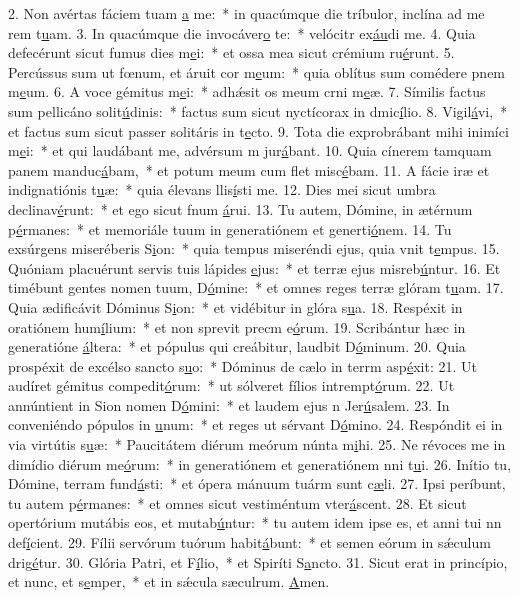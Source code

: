 2. Non avértas fáciem tuam \uline{a} me:~* in quacúmque die tríbulor, inclína ad me rem t\uline{u}am.
3. In quacúmque die invocáver\uline{o} te:~* velócitr ex\uline{áu}di me.
4. Quia defecérunt sicut fumus dies m\uline{e}i:~* et ossa mea sicut crémium ru\uline{é}runt.
5. Percússus sum ut fœnum, et áruit cor m\uline{e}um:~* quia oblítus sum comédere pnem m\uline{e}um.
6. A voce gémitus m\uline{e}i:~* adhǽsit os meum crni m\uline{e}æ.
7. Símilis factus sum pellicáno solit\uline{ú}dinis:~* factus sum sicut nyctícorax in dmic\uline{í}lio.
8. Vigil\uline{á}vi,~* et factus sum sicut passer solitáris in t\uline{e}cto.
9. Tota die exprobrábant mihi inimíci m\uline{e}i:~* et qui laudábant me, advérsum m jur\uline{á}bant.
10. Quia cínerem tamquam panem manduc\uline{á}bam,~* et potum meum cum flet misc\uline{é}bam.
11. A fácie iræ et indignatiónis t\uline{u}æ:~* quia élevans llis\uline{í}sti me.
12. Dies mei sicut umbra declinav\uline{é}runt:~* et ego sicut fnum \uline{á}rui.
13. Tu autem, Dómine, in ætérnum p\uline{é}rmanes:~* et memoriále tuum in generatiónem et generti\uline{ó}nem.
14. Tu exsúrgens miseréberis S\uline{i}on:~* quia tempus miseréndi ejus, quia vnit t\uline{e}mpus.
15. Quóniam placuérunt servis tuis lápides \uline{e}jus:~* et terræ ejus misreb\uline{ú}ntur.
16. Et timébunt gentes nomen tuum, D\uline{ó}mine:~* et omnes reges terræ glóram t\uline{u}am.
17. Quia ædificávit Dóminus S\uline{i}on:~* et vidébitur in glóra s\uline{u}a.
18. Respéxit in oratiónem hum\uline{í}lium:~* et non sprevit precm e\uline{ó}rum.
19. Scribántur hæc in generatióne \uline{á}ltera:~* et pópulus qui creábitur, laudbit D\uline{ó}minum.
20. Quia prospéxit de excélso sancto s\uline{u}o:~* Dóminus de cælo in terrm asp\uline{é}xit:
21. Ut audíret gémitus compedit\uline{ó}rum:~* ut sólveret fílios intrempt\uline{ó}rum.
22. Ut annúntient in Sion nomen D\uline{ó}mini:~* et laudem ejus n Jer\uline{ú}salem.
23. In conveniéndo pópulos in \uline{u}num:~* et reges ut sérvant D\uline{ó}mino.
24. Respóndit ei in via virtútis s\uline{u}æ:~* Paucitátem diérum meórum núnta m\uline{i}hi.
25. Ne révoces me in dimídio diérum me\uline{ó}rum:~* in generatiónem et generatiónem nni t\uline{u}i.
26. Inítio tu, Dómine, terram fund\uline{á}sti:~* et ópera mánuum tuárm sunt c\uline{æ}li.
27. Ipsi períbunt, tu autem p\uline{é}rmanes:~* et omnes sicut vestiméntum vter\uline{á}scent.
28. Et sicut opertórium mutábis eos, et mutab\uline{ú}ntur:~* tu autem idem ipse es, et anni tui nn def\uline{í}cient.
29. Fílii servórum tuórum habit\uline{á}bunt:~* et semen eórum in sǽculum drig\uline{é}tur.
30. Glória Patri, et F\uline{í}lio,~* et Spiríti S\uline{a}ncto.
31. Sicut erat in princípio, et nunc, et s\uline{e}mper,~* et in sǽcula sæculrum. \uline{A}men.
